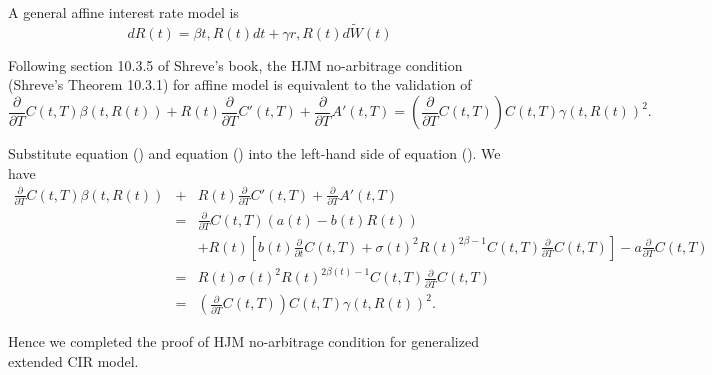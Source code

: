 \documentclass[6pt]{article}
\numberwithin{equation}{section}
\begin{document}
A general affine interest rate model is
$$
d R(t) = \beta{t,R(t)}dt + \gamma{r,R(t)} d\tilde{W}(t)
$$

Following section 10.3.5 of Shreve's book, the HJM no-arbitrage condition (Shreve's Theorem 10.3.1) for affine model is equivalent to the validation of
\begin{equation}\label{hjm}
\frac{\partial}{\partial T} C(t,T) \beta(t, R(t)) + R(t) \frac{\partial}{\partial T} C'(t,T) + \frac{\partial}{\partial T} A'(t,T) = \left(\frac{\partial}{\partial T} C(t,T)\right) C(t,T) \gamma(t,R(t))^2.
\end{equation}

Substitute equation (\label{pde_c}) and equation (\label{pde_a}) into the left-hand side of equation (\label{hjm}). We have
\begin{eqnarray*}
\frac{\partial}{\partial T} C(t,T) \beta(t, R(t)) &+& R(t) \frac{\partial}{\partial T} C'(t,T) + \frac{\partial}{\partial T} A'(t,T) \\
&=& \frac{\partial}{\partial T} C(t,T) (a(t)-b(t)R(t)) \\
& & + R(t)[b(t) \frac{\partial}{\partial t} C(t,T) + \sigma(t)^2 R(t)^{2\beta-1} C(t,T)\frac{\partial}{\partial T}C(t,T)] -a \frac{\partial}{\partial T}C(t,T) \\
&=& R(t)\sigma(t)^2 R(t)^{2\beta(t)-1} C(t,T)\frac{\partial}{\partial T} C(t,T) \\
&=& \left(\frac{\partial}{\partial T} C(t,T)\right) C(t,T) \gamma(t,R(t))^2.
\end{eqnarray*}

Hence we completed the proof of HJM no-arbitrage condition for generalized extended CIR model.
\end{document}

